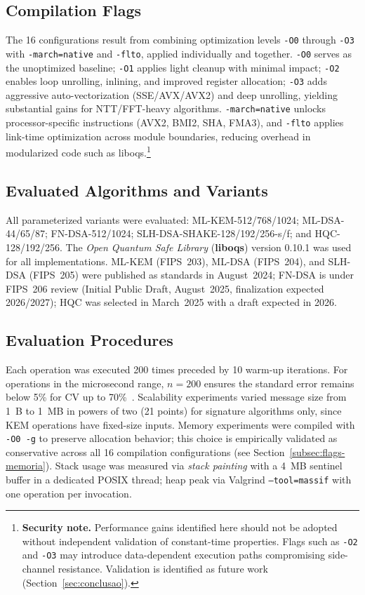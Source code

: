 \documentclass[12pt]{article}
\begin{document}
\subsection{Compilation Flags}
The 16 configurations result from combining optimization levels
\texttt{-O0} through \texttt{-O3} with \texttt{-march=native} and
\texttt{-flto}, applied individually and together. \texttt{-O0} serves
as the unoptimized baseline; \texttt{-O1} applies light cleanup with
minimal impact; \texttt{-O2} enables loop unrolling, inlining, and
improved register allocation; \texttt{-O3} adds aggressive
auto-vectorization (SSE/AVX/AVX2) and deep unrolling, yielding
substantial gains for NTT/FFT-heavy algorithms. \texttt{-march=native}
unlocks processor-specific instructions (AVX2, BMI2, SHA, FMA3), and
\texttt{-flto} applies link-time optimization across module boundaries,
reducing overhead in modularized code such as liboqs.\footnote{\textbf{Security note.} Performance gains identified here should not be adopted without independent validation of constant-time properties. Flags such as \texttt{-O2} and \texttt{-O3} may introduce data-dependent execution paths compromising side-channel resistance. Validation is identified as future work (Section~\ref{sec:conclusao}).}

\subsection{Evaluated Algorithms and Variants}
All parameterized variants were evaluated: ML-KEM-512/768/1024;
ML-DSA-44/65/87; FN-DSA-512/1024; SLH-DSA-SHAKE-128/192/256-s/f; and
HQC-128/192/256. The \textit{Open Quantum Safe Library} (\textbf{liboqs})
version 0.10.1 was used for all implementations. ML-KEM (FIPS~203),
ML-DSA (FIPS~204), and SLH-DSA (FIPS~205) were published as standards in
August~2024; FN-DSA is under FIPS~206 review (Initial Public Draft,
August~2025, finalization expected 2026/2027); HQC was selected in
March~2025 with a draft expected in 2026.

\subsection{Evaluation Procedures}
Each operation was executed 200 times preceded by 10 warm-up iterations.
For operations in the microsecond range, $n=200$ ensures the standard error
remains below 5\% for CV up to 70\%~\cite{Opilka:2024}. Scalability
experiments varied message size from 1~B to 1~MB in powers of two (21
points) for signature algorithms only, since KEM operations have fixed-size
inputs. Memory experiments were compiled with \texttt{-O0 -g} to preserve
allocation behavior; this choice is empirically validated as conservative
across all 16 compilation configurations
(see Section~\ref{subsec:flags-memoria}). Stack usage was measured via
\textit{stack painting} with a 4~MB sentinel buffer in a dedicated POSIX
thread; heap peak via Valgrind \texttt{--tool=massif} with one operation
per invocation.
\end{document}
